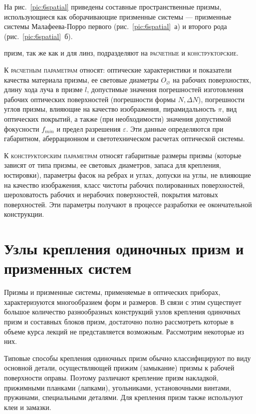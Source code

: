 На рис.~\ref{pic:6spatial} приведены составные пространственные призмы, использующиеся как оборачивающие призменные системы --- призменные системы Малафеева-Порро первого (рис.~\ref{pic:6spatial}~а) и второго рода (рис.~\ref{pic:6spatial}~б).

 призм, так же как и для линз, подразделяют на \textsc{расчетные} и \textsc{конструкторские}.

К \textsc{расчетным параметрам} относят: оптические характеристики и показатели качества материала призмы, ее световые диаметры $ O_\varnothing $ на рабочих поверхностях, длину хода луча в призме $ l $, допустимые значения погрешностей изготовления рабочих оптических поверхностей (погрешности формы $ N , \Delta N$), погрешности углов призмы, влияющие на качество изображения, пирамидальность $ \pi $, вид оптических покрытий, а также (при необходимости) значения допустимой фокусности $ f_{min} $ и предел разрешения $ \varepsilon $. 
Эти данные определяются при габаритном, аберрационном и светотехническом расчетах оптической системы.

К \textsc{конструкторским параметрам} относят габаритные размеры призмы (которые зависят от типа призмы, ее световых диаметров, запаса для крепления, юстировки), параметры фасок на ребрах и углах, допуски на углы, не влияющие на качество изображения, класс чистоты рабочих полированных поверхностей, шероховатость рабочих и нерабочих поверхностей, покрытия матовых поверхностей. 
Эти параметры получают в процессе разработки ее окончательной конструкции.

\section[Узлы крепления одиночных призм и призменных систем]{Узлы крепления одиночных призм и\\ призменных систем}

Призмы и призменные системы, применяемые в оптических приборах, характеризуются многообразием форм и размеров. В связи с этим существует большое количество разнообразных конструкций узлов крепления одиночных призм и составных блоков призм, достаточно полно рассмотреть которые в объеме курса лекций не представляется возможным. Рассмотрим некоторые из них.

Типовые способы крепления одиночных призм обычно классифицируют по виду основной детали, осуществляющей прижим (замыкание) призмы к рабочей поверхности оправы. Поэтому различают крепление призм накладкой, прижимными планками (лапками), угольниками, установочными винтами, пружинами, специальными деталями. Для крепления призм также используют клеи и замазки.

